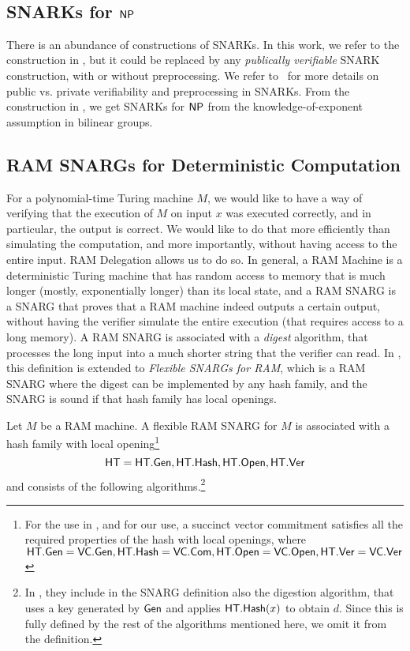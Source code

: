 \


\subsection{SNARKs for ${\mathsf{NP}}$}
There is an abundance of constructions of SNARKs. In this work, we refer to the construction in \cite{bitansky2013SNARKsLIPs}, but it could be replaced by any \emph{publically verifiable} SNARK construction, with or without preprocessing. We refer to~\cite{bitansky2013SNARKsLIPs, bitansky2013recursive} for more details on public vs. private verifiability and preprocessing in SNARKs.
From the construction in \cite{bitansky2013SNARKsLIPs}, we get SNARKs for ${\mathsf{NP}}$ from the knowledge-of-exponent assumption in bilinear groups. 

\subsection{RAM SNARGs for Deterministic Computation}\label{app:ramsnargs}
For a polynomial-time Turing machine $M$, we would like to have a way of verifying that the execution of $M$ on input $x$ was executed correctly, and in particular, the output is correct. We would like to do that more efficiently than simulating the computation, and more importantly, without having access to the entire input. RAM Delegation allows us to do so. In general, a RAM Machine is a deterministic Turing machine that has random access to memory that is much longer (mostly, exponentially longer) than its local state, and a RAM SNARG is a SNARG that proves that a RAM machine indeed outputs a certain output, without having the verifier simulate the entire execution (that requires access to a long memory). A RAM SNARG is associated with a \emph{digest} algorithm, that processes the long input into a much shorter string that the verifier can read. In \cite{cryptoeprint:2022/1320}, this definition is extended to \emph{Flexible SNARGs for RAM}, which is a RAM SNARG where the digest can be implemented by any hash family, and the SNARG is sound if that hash family has local openings.

Let $M$ be a RAM machine. A flexible RAM SNARG for $M$ is associated with a hash family with local opening\footnote{
For the use in \cite{cryptoeprint:2022/1320}, and for our use, a succinct vector commitment satisfies all the required properties of the hash with local openings, where $\mathsf{HT}.\mathsf{Gen} = \mathsf{VC}.\mathsf{Gen}, \mathsf{HT}.\mathsf{Hash} = \mathsf{VC}.\mathsf{Com}, \mathsf{HT}.\mathsf{Open} = \mathsf{VC}.\mathsf{Open}, \mathsf{HT}.\mathsf{Ver} = \mathsf{VC}.\mathsf{Ver}$
}
$$\mathsf{HT} = \mathsf{HT}.\mathsf{Gen}, \mathsf{HT}.\mathsf{Hash}, \mathsf{HT}.\mathsf{Open}, \mathsf{HT}.\mathsf{Ver}$$ and consists of the following  algorithms.\footnote{
In \cite{cryptoeprint:2022/1320}, they include in the SNARG definition also the digestion algorithm, that uses a key generated by $\mathsf{Gen}$ and applies $\mathsf{HT}.\mathsf{Hash}(x)$ to obtain $d$. Since this is fully defined by the rest of the algorithms mentioned here, we omit it from the definition.
}
